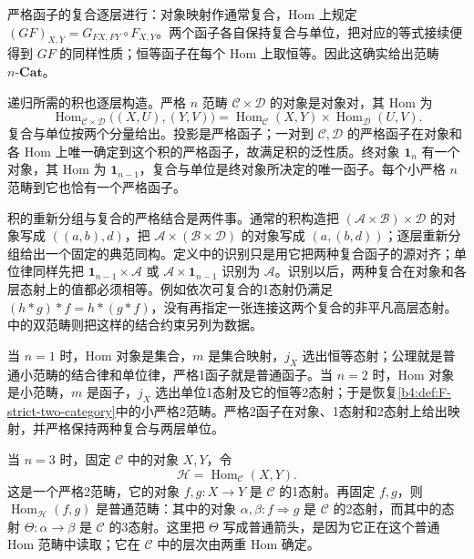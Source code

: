 严格函子的复合逐层进行：对象映射作通常复合，Hom 上规定 \((GF)_{X,Y}=G_{FX,FY}\circ F_{X,Y}\)。两个函子各自保持复合与单位，把对应的等式接续便得到 \(GF\) 的同样性质；恒等函子在每个 Hom 上取恒等。因此这确实给出范畴 \(n\text{-}\mathbf{Cat}\)。

\ProseParagraphBreak

递归所需的积也逐层构造。严格 \(n\) 范畴 \(\mathcal C\times\mathcal D\) 的对象是对象对，其 Hom 为
\[
	\operatorname{Hom}_{\mathcal C\times\mathcal D}\bigl((X,U),(Y,V)\bigr) =\operatorname{Hom}_{\mathcal C}(X,Y)\times\operatorname{Hom}_{\mathcal D}(U,V).
\]
复合与单位按两个分量给出。投影是严格函子；一对到 \(\mathcal C,\mathcal D\) 的严格函子在对象和各 Hom 上唯一确定到这个积的严格函子，故满足积的泛性质。终对象 \(\mathbf1_n\) 有一个对象，其 Hom 为 \(\mathbf1_{n-1}\)，复合与单位是终对象所决定的唯一函子。每个小严格 \(n\) 范畴到它也恰有一个严格函子。

\ProseParagraphBreak

积的重新分组与复合的严格结合是两件事。通常的积构造把 \((\mathcal A\times\mathcal B)\times\mathcal D\) 的对象写成 \(((a,b),d)\)，把 \(\mathcal A\times(\mathcal B\times\mathcal D)\) 的对象写成 \((a,(b,d))\)；逐层重新分组给出一个固定的典范同构。定义中的识别只是用它把两种复合函子的源对齐；单位律同样先把 \(\mathbf1_{n-1}\times\mathcal A\) 或 \(\mathcal A\times\mathbf1_{n-1}\) 识别为 \(\mathcal A\)。识别以后，两种复合在对象和各层态射上的值都必须相等。例如依次可复合的1态射仍满足 \((h*g)*f=h*(g*f)\)，没有再指定一张连接这两个复合的非平凡高层态射。中的双范畴则把这样的结合约束另列为数据。

\ProseParagraphBreak

当 \(n=1\) 时，Hom 对象是集合，\(m\) 是集合映射，\(j_X\) 选出恒等态射；公理就是普通小范畴的结合律和单位律，严格1函子就是普通函子。当 \(n=2\) 时，Hom 对象是小范畴，\(m\) 是函子，\(j_X\) 选出单位1态射及它的恒等2态射；于是恢复\cref{b4:def:F-strict-two-category}中的小严格2范畴。严格2函子在对象、1态射和2态射上给出映射，并严格保持两种复合与两层单位。

\ProseParagraphBreak

当 \(n=3\) 时，固定 \(\mathcal C\) 中的对象 \(X,Y\)，令
\[
	\mathcal H=\operatorname{Hom}_{\mathcal C}(X,Y).
\]
这是一个严格2范畴，它的对象 \(f,g:X\rightarrow Y\) 是 \(\mathcal C\) 的1态射。再固定 \(f,g\)，则 \(\operatorname{Hom}_{\mathcal H}(f,g)\) 是普通范畴：其中的对象 \(\alpha,\beta:f\Rightarrow g\) 是 \(\mathcal C\) 的2态射，而其中的态射 \(\Theta:\alpha\rightarrow\beta\) 是 \(\mathcal C\) 的3态射。这里把 \(\Theta\) 写成普通箭头，是因为它正在这个普通 Hom 范畴中读取；它在 \(\mathcal C\) 中的层次由两重 Hom 确定。

